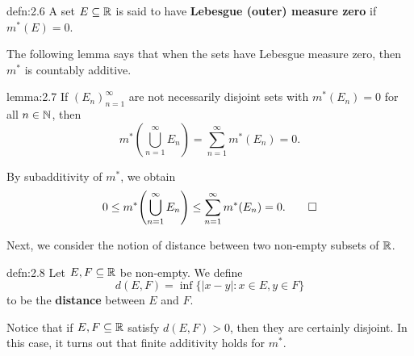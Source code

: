 \begin{defn}{defn:2.6}
    A set $E \subseteq \mathbb{R}$ is said to have {\bf Lebesgue (outer) measure 
    zero} if $m^*(E) = 0$.
\end{defn}

The following lemma says that when the sets have Lebesgue measure zero, 
then $m^*$ is countably additive. 

\begin{lemma}{lemma:2.7}
    If $(E_n)_{n=1}^\infty$ are not necessarily disjoint sets with 
    $m^*(E_n) = 0$ for all $n \in \mathbb{N}$, then 
    \[ m^*\!\left( \bigcup_{n=1}^\infty E_n \right) = 
    \sum_{n=1}^\infty m^*(E_n) = 0. \] 
\end{lemma}
\begin{pf}
    By subadditivity of $m^*$, we obtain 
    \[ 0 \leq m^*\!\left( \bigcup_{n=1}^\infty E_n \right) \leq 
    \sum_{n=1}^\infty m^*(E_n) = 0. \qedhere \] 
\end{pf}

Next, we consider the notion of distance between two non-empty subsets of $\mathbb{R}$.

\begin{defn}{defn:2.8}
    Let $E, F \subseteq \mathbb{R}$ be non-empty. We define 
    \[ d(E, F) = \inf\{|x - y| : x\in E, y\in F\} \] 
    to be the {\bf distance} between $E$ and $F$. 
\end{defn}

Notice that if $E, F \subseteq \mathbb{R}$ satisfy $d(E, F) > 0$, then they are 
certainly disjoint. In this case, it turns out that finite additivity holds
for $m^*$.

